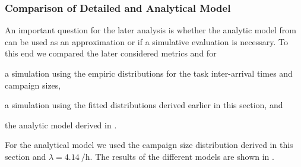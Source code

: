 \subsubsection*{Comparison of Detailed and Analytical Model}
An important question for the later analysis is whether the analytic model from  can be used as an approximation or if a simulative evaluation is necessary.
To this end we compared the later considered metrics \workerUtilization and \preTaskProcessingDelay for 
\begin{enumerate*}
\item a simulation using the empiric distributions for the task inter-arrival times and campaign sizes,
\item a simulation using the fitted distributions derived earlier in this section, and
\item the analytic model derived in .
\end{enumerate*}
For the analytical model we used the campaign size distribution derived in this section and \(\lambda=\SI{4.14}{\per\hour}\).
The results of the different models are shown in .

